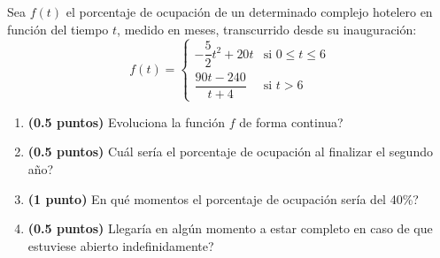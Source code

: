 
Sea $f(t)$ el porcentaje de ocupación de un determinado complejo hotelero en función del tiempo $t$, medido en meses, transcurrido desde su inauguración:
\[
f(t)=\begin{cases}
-\dfrac{5}{2}t^2+20t & \text{si }0\leq t\leq6\\[4pt]
\dfrac{90t-240}{t+4} & \text{si }t>6
\end{cases}
\]
\begin{enumerate}[label=\alph*)]
\item \textbf{(0.5 puntos)} \textquestiondown{}Evoluciona la función $f$ de forma continua?
\item \textbf{(0.5 puntos)} \textquestiondown{}Cuál sería el porcentaje de ocupación al finalizar el segundo año?
\item \textbf{(1 punto)} \textquestiondown{}En qué momentos el porcentaje de ocupación sería del 40\%?
\item \textbf{(0.5 puntos)} \textquestiondown{}Llegaría en algún momento a estar completo en caso de que estuviese abierto indefinidamente?
\end{enumerate}
